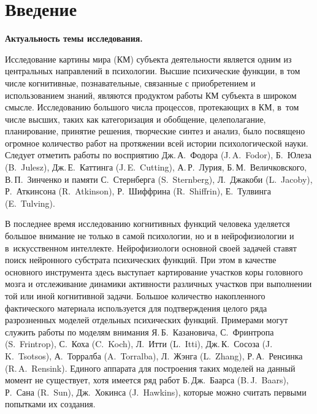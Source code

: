 \chapter*{Введение}							%
\textbf{Актуальность темы исследования.} 

Исследование картины мира (КМ) субъекта деятельности является одним из центральных направлений в психологии. Высшие психические функции, в том числе когнитивные, познавательные, связанные с приобретением и использованием знаний, являются продуктом работы КМ субъекта в широком смысле. Исследованию большого числа процессов, протекающих в КМ, в~том числе высших, таких как категоризация и обобщение, целеполагание, планирование, принятие решения, творческие синтез и анализ, было посвящено огромное количество работ на протяжении всей истории психологической науки. Следует отметить работы по восприятию Дж.\,А.~Фодора (J.\,A.~Fodor), Б.~Юлеза (B.~Julesz), Дж.\,Е.~Каттинга (J.\,E.~Cutting), А.\,Р.~Лурия, Б.\,М.~Величковского, В.\,П.~Зинченко и памяти С.~Стернберга (S.~Sternberg), Л.~Джакоби (L.~Jacoby), Р.~Аткинсона (R.~Atkinson), Р.~Шиффрина (R.~Shiffrin), Е.~Тулвинга (E.~Tulving).

В последнее время исследованию когнитивных функций человека уделяется большое внимание не только в самой психологии, но и в нейрофизиологии и в~искусственном интеллекте. Нейрофизиологи основной своей задачей ставят поиск нейронного субстрата психических функций. При этом в качестве основного инструмента здесь выступает картирование участков коры головного мозга и отслеживание динамики активности различных участков при выполнении той или иной когнитивной задачи. Большое количество накопленного фактического материала используется для подтверждения целого ряда разрозненных моделей отдельных психических функций. Примерами могут служить работы по моделям внимания Я.\,Б.~Казановича, С.~Фринтропа (S.~Frintrop), С.~Коха (C.~Koch), Л.~Итти (L.~Itti), Дж.\,К.~Сосоза (J.\,K.~Tsotsos), А.~Торралба (A.~Torralba), Л.~Жэнга (L.~Zhang), Р.\,А.~Ренсинка (R.\,A.~Rensink). Единого аппарата для построения таких моделей на данный момент не существует, хотя имеется ряд работ Б.\,Дж.~Баарса (B.\,J.~Baars), Р.~Сана (R.~Sun), Дж.~Хокинса (J.~Hawkins), которые можно считать первыми попытками их создания.

